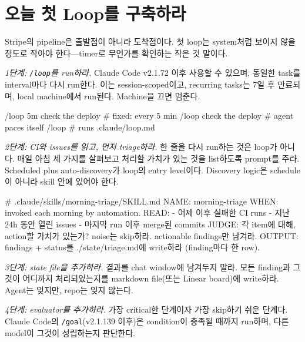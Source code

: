 \documentclass[conference]{IEEEtran}
\begin{document}
\section{오늘 첫 Loop를 구축하라}
Stripe의 pipeline은 출발점이 아니라 도착점이다. 첫 loop는 system처럼 보이지 않을 정도로 작아야 한다---timer로 무언가를 확인하는 작은 것 말이다.

\emph{1단계: \texttt{/loop}를 run하라.} Claude Code v2.1.72 이후 사용할 수 있으며, 동일한 task를 interval마다 다시 run한다. 이는 session-scoped이고, recurring tasks는 7일 후 만료되며, local machine에서 run된다. Machine을 끄면 멈춘다.

\begin{code}
/loop 5m check the deploy   # fixed: every 5 min
/loop check the deploy      # agent paces itself
/loop                       # runs .claude/loop.md
\end{code}

\emph{2단계: CI와 issues를 읽고, 먼저 triage하라.} 한 줄을 다시 run하는 것은 loop가 아니다. 매일 아침 세 가지를 살펴보고 처리할 가치가 있는 것을 list하도록 prompt를 주라. Scheduled plus auto-discovery가 loop의 entry level이다. Discovery logic은 schedule이 아니라 skill 안에 있어야 한다.

\begin{code}
# .claude/skills/morning-triage/SKILL.md
NAME: morning-triage
WHEN: invoked each morning by automation.
READ:
- 어제 이후 실패한 CI runs
- 지난 24h 동안 열린 issues
- 마지막 run 이후 merge된 commits
JUDGE: 각 item에 대해, action할 가치가 있는가?
       noise는 skip하라. actionable findings만 남겨라.
OUTPUT: findings + status를
        ./state/triage.md에 write하라 (finding마다 한 row).
\end{code}

\emph{3단계: state file을 추가하라.} 결과를 chat window에 남겨두지 말라. 모든 finding과 그것이 어디까지 처리되었는지를 markdown file(또는 Linear board)에 write하라. Agent는 잊지만, repo는 잊지 않는다.


\emph{4단계: evaluator를 추가하라.} 가장 critical한 단계이자 가장 skip하기 쉬운 단계다. Claude Code의 \texttt{/goal}(v2.1.139 이후)은 condition이 충족될 때까지 run하며, 다른 model이 그것이 성립하는지 판단한다.
\end{document}
